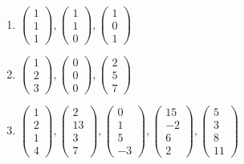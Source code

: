 \begin{enumerate}


\item
$\left( \begin{array}{c} 1 \\ 1 \\ 1 \end{array} \right) , 
\left( \begin{array}{c} 1 \\ 1 \\ 0 \end{array} \right) , 
\left( \begin{array}{c} 1 \\ 0 \\ 1 \end{array} \right) 
$


\item
$\left( \begin{array}{c} 1 \\ 2 \\ 3 \end{array} \right) , 
\left( \begin{array}{c} 0 \\ 0 \\ 0 \end{array} \right) , 
\left( \begin{array}{c} 2 \\ 5 \\ 7 \end{array} \right) $



\item
$\left( \begin{array}{c} 1 \\ 2 \\ 1 \\ 4\end{array} \right) , 
\left( \begin{array}{c} 2 \\ 13 \\ 3 \\ 7\end{array} \right) , 
\left( \begin{array}{c} 0 \\ 1 \\ 5 \\ -3\end{array} \right) , 
\left( \begin{array}{c} 15 \\ -2 \\ 6 \\ 2\end{array} \right) , 
\left( \begin{array}{c} 5 \\ 3 \\ 8 \\ 11\end{array} \right) $




\end{enumerate}
